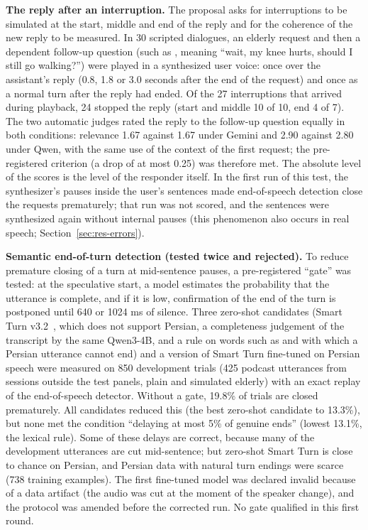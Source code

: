 \textbf{The reply after an interruption.} The proposal asks for interruptions to be simulated
at the start, middle and end of the reply and for the coherence of the new reply to be
measured. In 30 scripted dialogues, an elderly request and then a dependent follow-up question
(such as , meaning ``wait, my knee hurts,
should I still go walking?'') were played in a synthesized user voice: once over the
assistant's reply (0.8, 1.8 or 3.0 seconds after the end of the request) and once as a normal
turn after the reply had ended. Of the 27 interruptions that arrived during playback, 24
stopped the reply (start and middle 10 of 10, end 4 of 7). The two automatic judges rated the
reply to the follow-up question equally in both conditions: relevance 1.67 against 1.67 under
Gemini and 2.90 against 2.80 under Qwen, with the same use of the context of the first request;
the pre-registered criterion (a drop of at most 0.25) was therefore met. The absolute level of
the scores is the level of the responder itself. In the first run of this test, the
synthesizer's pauses inside the user's sentences made end-of-speech detection close the
requests prematurely; that run was not scored, and the sentences were synthesized again
without internal pauses (this phenomenon also occurs in real speech;
Section~\ref{sec:res-errors}).

\textbf{Semantic end-of-turn detection (tested twice and rejected).} To reduce premature closing of
a turn at mid-sentence pauses, a pre-registered ``gate'' was tested: at the speculative start,
a model estimates the probability that the utterance is complete, and if it is low,
confirmation of the end of the turn is postponed until 640 or 1024 ms of silence. Three
zero-shot candidates (Smart Turn v3.2~\cite{smartturn2025}, which does not support Persian, a
completeness judgement of the transcript by the same Qwen3-4B, and a rule on words such as
 and  with which a Persian utterance cannot end) and a version of Smart Turn
fine-tuned on Persian speech were measured on 850 development trials (425 podcast utterances
from sessions outside the test panels, plain and simulated elderly) with an exact replay of the
end-of-speech detector. Without a gate, 19.8\% of trials are closed prematurely. All candidates
reduced this (the best zero-shot candidate to 13.3\%), but none met the condition ``delaying at
most 5\% of genuine ends'' (lowest 13.1\%, the lexical rule). Some of these delays are correct,
because many of the development utterances are cut mid-sentence; but zero-shot Smart Turn is
close to chance on Persian, and Persian data with natural turn endings were scarce (738
training examples). The first fine-tuned model was declared invalid because of a data artifact
(the audio was cut at the moment of the speaker change), and the protocol was amended before the
corrected run. No gate qualified in this first round.

